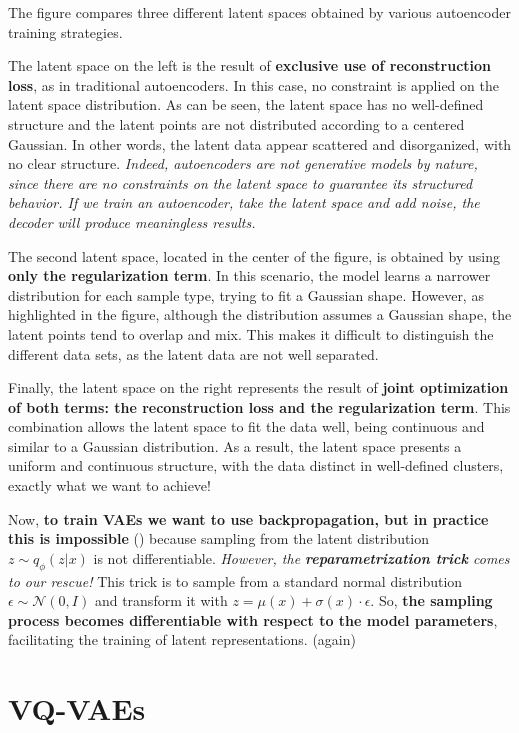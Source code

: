The figure compares three different latent spaces obtained by various autoencoder training strategies. 

The latent space on the left is the result of \textbf{exclusive use of reconstruction loss}, as in traditional autoencoders. In this case, no constraint is applied on the latent space distribution. As can be seen, the latent space has no well-defined structure and the latent points are not distributed according to a centered Gaussian. In other words, the latent data appear scattered and disorganized, with no clear structure. \textit{Indeed, autoencoders are not generative models by nature, since there are no constraints on the latent space to guarantee its structured behavior. If we train an autoencoder, take the latent space and add noise, the decoder will produce meaningless results. }

The second latent space, located in the center of the figure, is obtained by using \textbf{only the regularization term}. In this scenario, the model learns a narrower distribution for each sample type, trying to fit a Gaussian shape. However, as highlighted in the figure, although the distribution assumes a Gaussian shape, the latent points tend to overlap and mix. This makes it difficult to distinguish the different data sets, as the latent data are not well separated.

Finally, the latent space on the right represents the result of \textbf{joint optimization of both terms: the reconstruction loss and the regularization term}. This combination allows the latent space to fit the data well, being continuous and similar to a Gaussian distribution. As a result, the latent space presents a uniform and continuous structure, with the data distinct in well-defined clusters, exactly what we want to achieve! 


Now, \textbf{to train VAEs we want to use backpropagation, but in practice this is impossible} () because sampling from the latent distribution $z \sim q_{\phi}(z|x)$ is not differentiable. \textit{However, the \textit{\textbf{reparametrization trick}} comes to our rescue!} This trick is to sample from a standard normal distribution $\epsilon \sim \mathcal{N}(0, I)$ and transform it with $z = \mu(x) + \sigma(x) \cdot \epsilon$. So, \textbf{the sampling process becomes differentiable with respect to the model parameters}, facilitating the training of latent representations.  (again)


\section{VQ-VAEs}


